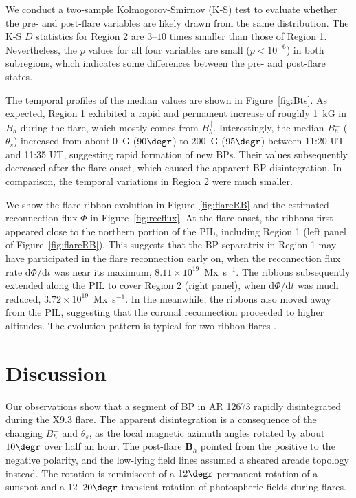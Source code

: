 \documentclass[times,twocolumn]{aastex631}
\begin{document}
\begin{CJK*}{UTF8}{gbsn}
We conduct a two-sample Kolmogorov-Smirnov (K-S) test to evaluate whether the pre- and post-flare variables are likely drawn from the same distribution. The K-S $D$ statistics for Region 2 are $3$--$10$ times smaller than those of Region 1. Nevertheless, the $p$ values for all four variables are small ($p<10^{-6}$) in both subregions, which indicates some differences between the pre- and post-flare states.

The temporal profiles of the median values are shown in Figure~\ref{fig:Bts}. As expected, Region 1 exhibited a rapid and permanent increase of roughly 1~kG in $B_{h}$ during the flare, which mostly comes from $B_{h}^\parallel$. Interestingly, the median $B_{h}^\perp$ ($\theta_s$) increased from about $0$~G ($90\degr$) to $200$~G ($95\degr$) between 11:20 UT and 11:35 UT, suggesting rapid formation of new BPs. Their values subsequently decreased after the flare onset, which caused the apparent BP disintegration. In comparison, the temporal variations in Region 2 were much smaller.

We show the flare ribbon evolution in Figure~\ref{fig:flareRB} and the estimated reconnection flux $\Phi$ in Figure~\ref{fig:recflux}. At the flare onset, the ribbons first appeared close to the northern portion of the PIL, including Region 1 (left panel of Figure~\ref{fig:flareRB}). This suggests that the BP separatrix in Region 1 may have participated in the flare reconnection early on, when the reconnection flux rate $\mathrm{d}\Phi/\mathrm{d}t$ was near its maximum, $8.11\times10^{19}$~Mx~s$^{-1}$. The ribbons subsequently extended along the PIL to cover Region 2 (right panel), when $\mathrm{d}\Phi/\mathrm{d}t$ was much reduced, $3.72\times10^{19}$~Mx~s$^{-1}$. In the meanwhile, the ribbons also moved away from the PIL, suggesting that the coronal reconnection proceeded to higher altitudes. The evolution pattern is typical for two-ribbon flares \citep{qiu2009}.


\section{Discussion}
\label{sec:discussion}

Our observations show that a segment of BP in AR 12673 rapidly disintegrated during the X9.3 flare. The apparent disintegration is a consequence of the changing $B_h^\perp$ and $\theta_s$, as the local magnetic azimuth angles rotated by about $10\degr$ over half an hour. The post-flare $\bm{B}_h$ pointed from the positive to the negative polarity, and the low-lying field lines assumed a sheared arcade topology instead. The rotation is reminiscent of a $12\degr$ permanent rotation of a sunspot \citep{liuc2016} and a $12$--$20\degr$ transient rotation of photospheric fields \citep{xuy2018} during flares.


\end{CJK*}
\end{document}
